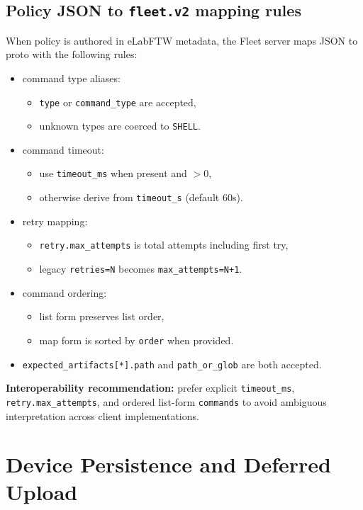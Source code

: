 \documentclass[11pt,a4paper]{article}
\begin{document}
\subsection{Policy JSON to \texttt{fleet.v2} mapping rules}
When policy is authored in eLabFTW metadata, the Fleet server maps JSON to proto with the following rules:
\begin{itemize}
  \item command type aliases:
    \begin{itemize}
      \item \texttt{type} or \texttt{command\_type} are accepted,
      \item unknown types are coerced to \texttt{SHELL}.
    \end{itemize}
  \item command timeout:
    \begin{itemize}
      \item use \texttt{timeout\_ms} when present and $>0$,
      \item otherwise derive from \texttt{timeout\_s} (default 60s).
    \end{itemize}
  \item retry mapping:
    \begin{itemize}
      \item \texttt{retry.max\_attempts} is total attempts including first try,
      \item legacy \texttt{retries=N} becomes \texttt{max\_attempts=N+1}.
    \end{itemize}
  \item command ordering:
    \begin{itemize}
      \item list form preserves list order,
      \item map form is sorted by \texttt{order} when provided.
    \end{itemize}
  \item \texttt{expected\_artifacts[*].path} and \texttt{path\_or\_glob} are both accepted.
\end{itemize}

\textbf{Interoperability recommendation:}
prefer explicit \texttt{timeout\_ms}, \texttt{retry.max\_attempts}, and ordered list-form \texttt{commands} to avoid ambiguous interpretation across client implementations.

\section{Device Persistence and Deferred Upload}
\end{document}

